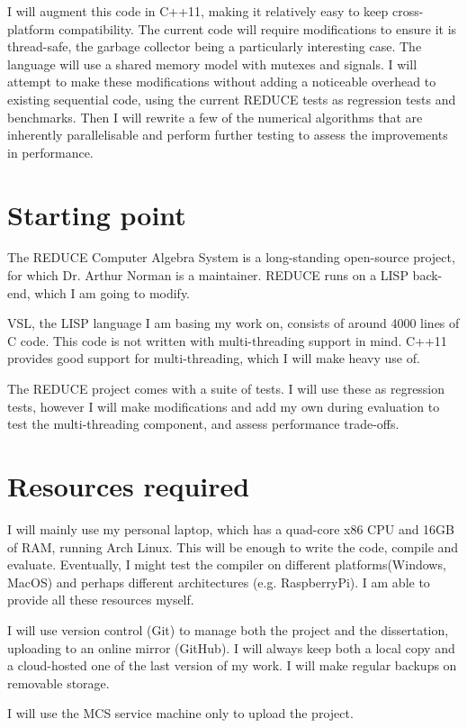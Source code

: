 \documentclass[12pt,a4paper,twoside]{article}
\begin{document}
I will augment this code in C++11,  making it
relatively easy to keep cross-platform compatibility. The current
code will require modifications to ensure it is thread-safe,
the garbage collector being a particularly interesting case.
The language will use a shared memory model with mutexes and signals.
I will attempt to make these modifications without adding a
noticeable overhead to existing sequential code, using the current
REDUCE tests as regression tests and benchmarks. Then I will rewrite
a few of the numerical algorithms that are inherently parallelisable
and perform further testing to assess the improvements in performance.

\section*{Starting point}

The REDUCE Computer Algebra System
is a long-standing open-source
project, for which Dr. Arthur Norman is a maintainer. REDUCE runs on a
LISP back-end, which I am going to modify.

VSL,  the LISP language I am basing my work on, consists of around 4000 lines of
C code. This code is not written with multi-threading support in mind. C++11 provides good support for multi-threading, which I will make heavy use of.

The REDUCE project comes with a suite of tests. I will use these as regression tests,
however I will make modifications and add my own during evaluation to test
the multi-threading component, and assess performance trade-offs.

\section*{Resources required}

I will mainly use my personal laptop, which has a quad-core x86 CPU
and 16GB of RAM, running Arch Linux. This will be enough to write the code, compile and evaluate.
Eventually, I might test the compiler on different platforms(Windows, MacOS) and perhaps
different architectures (e.g. RaspberryPi). I am able to provide all these resources myself.

I will use version control (Git) to manage both the project and the dissertation, uploading
to an online mirror (GitHub). I will always keep both a local copy and a cloud-hosted one of the
last version of my work. I will make regular backups on removable storage.

I will use the MCS service machine only to upload the project.
\end{document}
